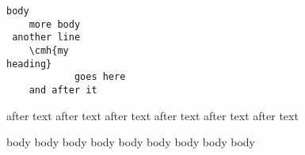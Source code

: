 \begin{verbatim}
body
    more body
 another line
    \cmh{my 
heading}
            goes here
    and after it
    \end{verbatim}

after text after text 
after text after text 
after text after text 
\begin{not}
	body body body
	body body body
	body body body
\end{not}

